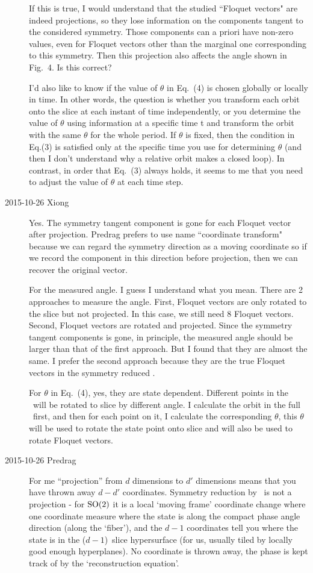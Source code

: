 \begin{description}
If this is true, I would understand that the studied ``Floquet vectors"
are indeed projections, so they lose information on the components
tangent to the considered symmetry. Those components can a priori have
non-zero values, even for Floquet vectors other than the marginal one
corresponding to this symmetry. Then this projection also affects the
angle shown in Fig.~4. Is this correct?

I'd also like to know if the value of $\theta$ in Eq.~(4) is chosen globally
or locally in time. In other words, the question is whether you
transform each orbit onto the slice at each instant of time
independently, or you determine the value of $\theta$ using information at
a specific time t and transform the orbit with the same $\theta$ for the
whole period. If $\theta$ is fixed, then the condition in Eq.(3) is
satisfied only at the specific time you use for determining $\theta$ (and
then I don't understand why a relative orbit makes a closed loop). In
contrast, in order that Eq.~(3) always holds, it seems to me that you
need to adjust the value of $\theta$ at each time step.

\item[2015-10-26 Xiong]
Yes. The symmetry tangent component is gone for each Floquet vector after
projection.  Predrag prefers to use name ``coordinate transform" because
we can regard the symmetry direction as a moving coordinate so if we
record the component in this direction before projection, then we can
recover the original vector.

For the measured angle. I guess I understand what you mean. There are 2
approaches to measure the angle. First, Floquet vectors are only rotated
to the slice but not projected. In this case, we still need 8 Floquet
vectors. Second, Floquet vectors are rotated and projected. Since the
symmetry tangent components is gone, in principle, the measured angle
should be larger than that of the first approach. But I found that they
are almost the same. I prefer the second approach because they are the
true Floquet vectors in the symmetry reduced \statesp.

For $\theta$ in Eq.~(4), yes, they are state dependent. Different points
in the \statesp\ will be rotated to slice by different angle. I
calculate the orbit in the full \statesp\ first, and then for each
point on it, I calculate the corresponding $\theta$, this $\theta$ will
be used to rotate the state point onto slice and will also be used to
rotate Floquet vectors.

\item[2015-10-26 Predrag]
For me ``projection'' from $d$ dimensions to $d'$ dimensions means that
you have thrown away $d-d'$ coordinates. Symmetry reduction by \mslices\
is not a projection - for $\textrm{SO}(2)$ it is a local `moving frame'
coordinate change where one coordinate measure where the state is along
the compact phase angle direction (along the `fiber'), and the $d\!-\!1$
coordinates tell you where the state is in the ($d\!-\!1$)\dmn\ slice
hypersurface (for us, usually tiled by locally good enough hyperplanes).
No coordinate is thrown away, the phase is kept track of by the
`reconstruction equation'.


\end{description}
